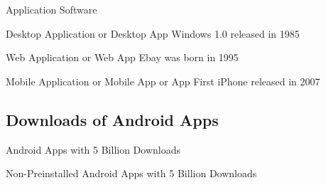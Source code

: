 \begin{frame}{Application Software}
	\begin{fancycolumns}[T,widths={46}]
		\begin{example}{Desktop Application or Desktop App}
			Windows 1.0 released in 1985
		\end{example}
	\nextcolumn
		\begin{example}{Web Application or Web App}
			Ebay was born in 1995
		\end{example}
		\hfill\pause
		\begin{example}{Mobile Application or Mobile App or App}
			First iPhone released in 2007
		\end{example}
	\end{fancycolumns}
\end{frame}


\subsection{Downloads of Android Apps}
\begin{frame}{Android Apps with 5 Billion Downloads }
	\centering{}
\end{frame}

\begin{frame}{Non-Preinstalled Android Apps with 5 Billion Downloads }
	\centering{}
\end{frame}

